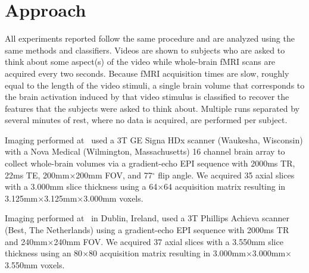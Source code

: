 \section{Approach}
\label{sec:approach}

All experiments reported follow the same procedure and are analyzed using the
same methods and classifiers.
%
Videos are shown to subjects who are asked to think about some aspect(s) of the
video while whole-brain fMRI scans are acquired every two seconds.
%
Because fMRI acquisition times are slow, roughly equal to the length of the
video stimuli, a single brain volume that corresponds to the brain activation
induced by that video stimulus is classified to recover the features that the
subjects were asked to think about.
%
Multiple runs separated by several minutes of rest, where no data is acquired,
are performed per subject.


Imaging performed at \Purdue\ used a 3T GE Signa HDx scanner
(Waukesha, Wisconsin) with a Nova Medical (Wilmington, Massachusetts) 16
channel brain array to collect whole-brain volumes via a gradient-echo EPI
sequence with 2000ms TR, 22ms TE, 200mm$\times$200mm FOV, and 77$^{\circ}$ flip
angle.
%
We acquired 35 axial slices with a 3.000mm slice thickness using a 64$\times$64
acquisition matrix resulting in 3.125mm$\times$3.125mm$\times$3.000mm voxels.

Imaging performed at \StJames\ in Dublin, Ireland, used a 3T
Phillips Achieva scanner (Best, The Netherlands) using a gradient-echo EPI
sequence with 2000ms TR and 240mm$\times$240mm FOV.\@
%
We acquired 37 axial slices with a 3.550mm slice thickness using an
80$\times$80 acquisition matrix resulting in
3.000mm$\times$3.000mm$\times$3.550mm voxels.


